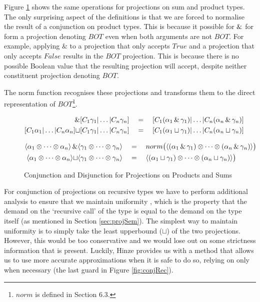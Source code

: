 Figure \ref{fig:conjDisSum} shows the same operations for projections on sum
and product types. The only surprising aspect of the definitions is that we are
forced to normalise the result of a conjunction on product types. This is
because it possible for $\operatorname{\&}$ for form a projection denoting $BOT$ even when
both arguments are not $BOT$. For example, applying $\&$ to a projection that
only accepts $True$ and a projection that only accepts $False$ results in the
$BOT$ projection. This is because there is no possible Boolean value that the
resulting projection will accept, despite neither constituent projection
denoting $BOT$.

The \<norm\> function recognises these projections and transforms them to the
direct representation of $BOT$\footnote{$norm$ is defined in
\cite{hinze1995projection} Section 6.3.}.

\begin{figure}
\noindent

\begin{align*}
[C_{1} \alpha_{1} | \dots | C_{n} \alpha_{n}] \pmeet&
[C_{1} \gamma_{1} | \dots | C_{n} \gamma_{n}] &&= \quad
[C_{1} (\alpha_{1} \pmeet \gamma_{1}) | \dots | C_{n} (\alpha_{n} \pmeet \gamma_{n})] \\
[C_{1} \alpha_{1} | \dots | C_{n} \alpha_{n}] \sqcup&
[C_{1} \gamma_{1} | \dots | C_{n} \gamma_{n}] &&= \quad
[C_{1} (\alpha_{1} \sqcup \gamma_{1}) | \dots | C_{n} (\alpha_{n} \sqcup \gamma_{n})]
\end{align*}%

\begin{align*}
\langle \alpha_{1} \otimes \dots \otimes \alpha_{n} \rangle \operatorname{\&}&
\langle \gamma_{1} \otimes \dots \otimes \gamma_{n} \rangle &&= \quad
norm \big( \langle (\alpha_{1} \operatorname{\&} \gamma_{1}) \otimes \dots \otimes (\alpha_{n} \operatorname{\&} \gamma_{n})\rangle \big) \\
\langle \alpha_{1} \otimes \dots \otimes \alpha_{n} \rangle \sqcup&
\langle \gamma_{1} \otimes \dots \otimes \gamma_{n} \rangle &&= \quad
\langle (\alpha_{1} \sqcup \gamma_{1}) \otimes \dots \otimes (\alpha_{n} \sqcup \gamma_{n})\rangle \big)
\end{align*}
\caption[Conjunction and Disjunction for Projections 2]{Conjunction and Disjunction for Projections on Products and Sums}
\label{fig:conjDisSum}
\end{figure}

For conjunction of projections on recursive types we have to perform additional
analysis to ensure that we maintain uniformity , which is the property that the
demand on the `recursive call' of the type is equal to the demand on the type
itself (as mentioned in Section \ref{sec:projSem}). The simplest way to
maintain uniformity is to simply take the least upperbound ($\sqcup$) of the
two projections.  However, this would be too conservative and we would lose out
on some strictness information that is present. Luckily, Hinze provides us with
a method that allows us to use more accurate approximations when it is safe to
do so, relying on \join only when necessary (the last guard in Figure
\ref{fig:conjRec}).

